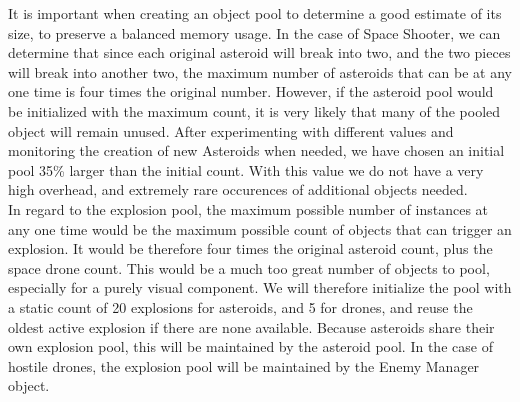  It is important when creating an object pool to determine a good estimate of its size, to preserve a balanced memory usage. In the case of Space Shooter, we can determine that since each original asteroid will break into two, and the two pieces will break into another two, the maximum number of asteroids that can be at any one time is four times the original number. However, if the asteroid pool would be initialized with the maximum count, it is very likely that many of the pooled object will remain unused. After experimenting with different values and monitoring the creation of new Asteroids when needed, we have chosen an initial pool 35\% larger than the initial count. With this value we do not have a very high overhead, and extremely rare occurences of additional objects needed. \\
 In regard to the explosion pool, the maximum possible number of instances at any one time would be the maximum possible count of objects that can trigger an explosion. It would be therefore four times the original asteroid count, plus the space drone count. This would be a much too great number of objects to pool, especially for a purely visual component. We will therefore initialize the pool with a static count of 20 explosions for asteroids, and 5 for drones, and reuse the oldest active explosion if there are none available. Because asteroids share their own explosion pool, this will be maintained by the asteroid pool. In the case of hostile drones, the explosion pool will be maintained by the Enemy Manager object. \\
 

